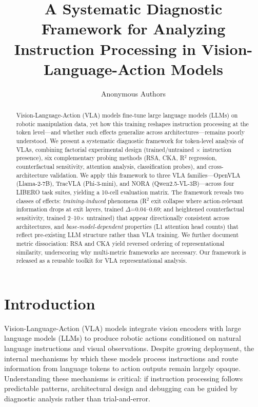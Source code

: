 \documentclass[letterpaper]{article}
\title{A Systematic Diagnostic Framework for Analyzing\\Instruction Processing in Vision-Language-Action Models}
\author{
  Anonymous Authors
}
\begin{document}
\maketitle

\begin{abstract}
Vision-Language-Action (VLA) models fine-tune large language models (LLMs) on robotic manipulation data, yet how this training reshapes instruction processing at the token level---and whether such effects generalize across architectures---remains poorly understood.
We present a systematic diagnostic framework for token-level analysis of VLAs, combining factorial experimental design (trained/untrained $\times$ instruction presence), six complementary probing methods (RSA, CKA, R$^2$ regression, counterfactual sensitivity, attention analysis, classification probes), and cross-architecture validation.
We apply this framework to three VLA families---OpenVLA (Llama-2-7B), TracVLA (Phi-3-mini), and NORA (Qwen2.5-VL-3B)---across four LIBERO task suites, yielding a 10-cell evaluation matrix.
The framework reveals two classes of effects: \emph{training-induced} phenomena (R$^2$ exit collapse where action-relevant information drops at exit layers, trained $\Delta$=0.04--0.69; and heightened counterfactual sensitivity, trained 2--10$\times$ untrained) that appear directionally consistent across architectures, and \emph{base-model-dependent} properties (L1 attention head counts) that reflect pre-existing LLM structure rather than VLA training.
We further document metric dissociation: RSA and CKA yield reversed ordering of representational similarity, underscoring why multi-metric frameworks are necessary.
Our framework is released as a reusable toolkit for VLA representational analysis.
\end{abstract}

\section{Introduction}

Vision-Language-Action (VLA) models \cite{brohan2023rt2,kim2024openvla} integrate vision encoders with large language models (LLMs) to produce robotic actions conditioned on natural language instructions and visual observations.
Despite growing deployment, the internal mechanisms by which these models process instructions and route information from language tokens to action outputs remain largely opaque.
Understanding these mechanisms is critical: if instruction processing follows predictable patterns, architectural design and debugging can be guided by diagnostic analysis rather than trial-and-error.
\end{document}
